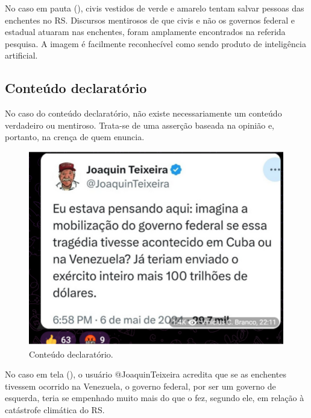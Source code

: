 \documentclass[portuguese]{textolivre}
\begin{document}
No caso em pauta (), civis vestidos de verde e amarelo tentam salvar pessoas das enchentes no RS. Discursos mentirosos de que civis e não os governos federal e estadual atuaram nas enchentes, foram amplamente encontrados na referida pesquisa. A imagem é facilmente reconhecível como sendo produto de inteligência artificial. 

\subsection{Conteúdo declaratório}
No caso do conteúdo declaratório, não existe necessariamente um conteúdo verdadeiro ou mentiroso. Trata-se de uma asserção baseada na opinião e, portanto, na crença de quem enuncia.

\begin{figure}[ht]
    \centering
    \begin{minipage}{.45\textwidth}
        \centering
        \includegraphics[width=\textwidth]{Imagens/Fig39.png}
        \caption{Conteúdo declaratório.}
        \label{fig-39}
    \end{minipage}
    \end{figure}
    
No caso em tela (), o usuário @JoaquinTeixeira acredita que se as enchentes tivessem ocorrido na Venezuela, o governo federal, por ser um governo de esquerda, teria se empenhado muito mais do que o fez, segundo ele, em relação à catástrofe climática do RS. 
\end{document}
